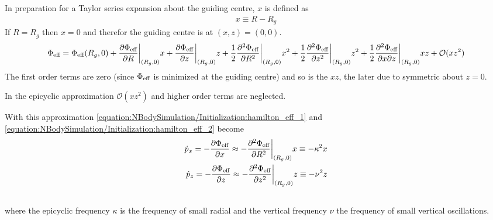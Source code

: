 \documentclass[letterpaper,10pt,english]{sphinxmanual}
\begin{document}
					\sphinxAtStartPar
					In preparation for a Taylor series expansion about the guiding centre, \(x\) is defined as
					\begin{equation*}
					\begin{split}x \equiv R - R_g\end{split}
					\end{equation*}
					\sphinxAtStartPar
					If \(R = R_g\) then \(x=0\) and therefor the guiding centre is at \((x,z) = (0,0)\).
					\begin{equation*}
					\begin{split}\Phi_{\textup{eff}} = \Phi_{\textup{eff}}(R_g,0) +
					\frac{\partial \Phi_{\textup{eff}} }{\partial R}\bigg|_{(R_g,0)}x +
					\frac{\partial \Phi_{\textup{eff}} }{\partial z}\bigg|_{(R_g,0)}z +
					\frac{1}{2}\frac{\partial^2 \Phi_{\textup{eff}} }{\partial R^2}\bigg|_{(R_g,0)}x^2 +
					\frac{1}{2}\frac{\partial^2 \Phi_{\textup{eff}} }{\partial z^2}\bigg|_{(R_g,0)}z^2 +
					\frac{1}{2}\frac{\partial^2 \Phi_{\textup{eff}} }{\partial x\partial z}\bigg|_{(R_g,0)}xz +
					\mathcal{O}(xz^2)\end{split}
					\end{equation*}
					\sphinxAtStartPar
					The first order terms are zero (since \(\Phi_{\textup{eff}}\) is minimized at the guiding centre) and so is the \(xz\), the later due to symmetric about \(z=0\).
					
					\sphinxAtStartPar
					In the epicyclic approximation \(\mathcal{O}(xz^2)\) and higher order terms are neglected.
					
					\sphinxAtStartPar
					With this approximation \eqref{equation:NBodySimulation/Initialization:hamilton_eff_1} and \eqref{equation:NBodySimulation/Initialization:hamilton_eff_2} become
					\begin{align}\label{equation:NBodySimulation/Initialization:hamilton_eff_approx}\!\begin{aligned}
					\dot{p}_{x} = -\frac{\partial \Phi_{\textup{eff}} }{\partial x} \approx
					 -\frac{\partial^2 \Phi_{\textup{eff}} }{\partial R^2}\bigg|_{(R_g,0)}x \equiv
					 -\kappa^2x\\
					\dot{p}_{z} = -\frac{\partial \Phi_{\textup{eff}} }{\partial z} \approx
					 -\frac{\partial^2 \Phi_{\textup{eff}} }{\partial z^2}\bigg|_{(R_g,0)}z \equiv
					 -\nu^2z   \\\\
					\end{aligned}\end{align}
					\sphinxAtStartPar
					where the epicyclic frequency \(\kappa\) is the frequency of small radial and the vertical frequency \(\nu\) the frequency of small vertical oscillations.
					
\end{document}
